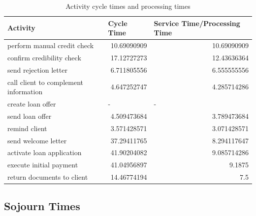 \documentclass[a4paper]{article} %
\begin{document}
\begin{table}[H]
  \centering
    \begin{tabular}{|l|r|r|}
    \hline
    Activity & \multicolumn{1}{l|}{Cycle Time} & \multicolumn{1}{l|}{Service Time/Processing Time} \bigstrut\\
    \hline
    perform manual credit check & 10.69090909 & 10.69090909 \bigstrut\\
    \hline
    confirm credibility check & 17.12727273 & 12.43636364 \bigstrut\\
    \hline
    send rejection letter & 6.711805556 & 6.555555556 \bigstrut\\
    \hline
    call client to complement information & 4.647252747 & 4.285714286 \bigstrut\\
    \hline
    create loan offer & \multicolumn{1}{l|}{-} & \multicolumn{1}{l|}{-} \bigstrut\\
    \hline
    send loan offer & 4.509473684 & 3.789473684 \bigstrut\\
    \hline
    remind client & 3.571428571 & 3.071428571 \bigstrut\\
    \hline
    send welcome letter & 37.29411765 & 8.294117647 \bigstrut\\
    \hline
    activate loan application & 41.90204082 & 9.085714286 \bigstrut\\
    \hline
    execute initial payment & 41.04956897 & 9.1875 \bigstrut\\
    \hline
    return documents to client & 14.46774194 & 7.5 \bigstrut\\
    \hline
    \end{tabular}%
    \caption{Activity cycle
times and processing times}
  \label{tab:addlabel}%
\end{table}%

\subsection{Sojourn Times}

\end{document}
